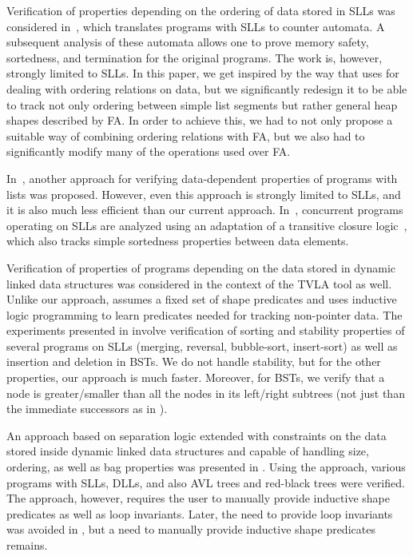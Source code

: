 Verification of properties depending on the ordering of data stored in SLLs was
considered in~\cite{lists-counters}, which translates programs with SLLs to
counter automata. A subsequent analysis of these automata allows one to prove
memory safety, sortedness, and termination for the original programs. The work
is, however, strongly limited to SLLs. In this paper, we get inspired by the way
that \cite{lists-counters} uses for dealing with ordering relations on data, but
we significantly redesign it to be able to track not only ordering between
simple list segments but rather general heap shapes described by FA. In order to
achieve this, we had to not only propose a suitable way of combining ordering
relations with FA, but we also had to significantly modify many of the
operations used over FA.

In~\cite{atva09}, another approach for verifying data-dependent properties of
programs with lists was proposed. However, even this approach is strongly
limited to SLLs, and it is also much less efficient than our current approach.
In~\cite{AHHR:integrated:rep}, concurrent programs operating on SLLs are analyzed
using an adaptation of a transitive closure logic~\cite{BiRa:vmcai06}, which
also tracks simple sortedness properties between data elements.

Verification of properties of programs depending on the data stored in dynamic
linked data structures was considered in the context of the TVLA tool
\cite{Loginov:AbstrRefViaInductLearning:05} as well. Unlike our approach,
\cite{Loginov:AbstrRefViaInductLearning:05} assumes a fixed set of shape
predicates and uses inductive logic programming to learn predicates needed for
tracking non-pointer data. The experiments presented in
\cite{Loginov:AbstrRefViaInductLearning:05} involve verification of sorting and
stability properties of several programs on SLLs (merging, reversal,
bubble-sort, insert-sort) as well as insertion and deletion in BSTs. We do not
handle stability, but for the other properties, our approach is much faster.
Moreover, for BSTs, we verify that a node is greater/smaller than all the nodes
in its left/right subtrees (not just than the immediate successors as in
\cite{Loginov:AbstrRefViaInductLearning:05}).

An approach based on separation logic extended with constraints on the data
stored inside dynamic linked data structures and capable of handling size,
ordering, as well as bag properties was presented in \cite{sleek12}. Using the
approach, various programs with SLLs, DLLs, and also AVL trees and red-black
trees were verified. The approach, however, requires the user to manually
provide inductive shape predicates as well as loop invariants.  Later, the need
to provide loop invariants was avoided in \cite{sleek13}, but a need to manually
provide inductive shape predicates remains.

